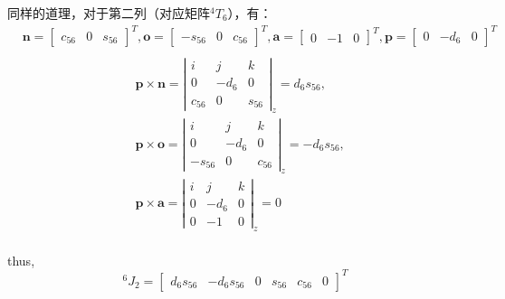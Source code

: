 \documentclass{ctexart}
\begin{document}
同样的道理，对于第二列（对应矩阵$^4T_6$），有：
\begin{equation*}
	\begin{aligned}
		&\boldsymbol{n} = \begin{bmatrix}
			c_{56} & 0 & s_{56}
		\end{bmatrix}^T, \boldsymbol{o} = \begin{bmatrix}
			-s_{56} & 0 & c_{56}
		\end{bmatrix}^T, \boldsymbol{a} = \begin{bmatrix}
			0 & -1 & 0
		\end{bmatrix}^T, \boldsymbol{p} = \begin{bmatrix}
			0 & -d_6 & 0
		\end{bmatrix}^T\\
	\end{aligned}
\end{equation*}
\begin{equation}
	\begin{aligned}
		&\boldsymbol{p}\times \boldsymbol{n} = \left| \begin{matrix}
			i & j & k \\
			0 & -d_6 & 0 \\
			c_{56} & 0 & s_{56}
		\end{matrix} \right|_z = d_6s_{56},\\& \boldsymbol{p}\times \boldsymbol{o} = \left| \begin{matrix}
			i & j & k \\
			0 & -d_6 & 0 \\
			-s_{56} & 0 & c_{56}
		\end{matrix} \right|_z = -d_6s_{56}, \\&\boldsymbol{p}\times \boldsymbol{a} = \left| \begin{matrix}
			i & j & k \\
			0 & -d_6 & 0 \\
			0 & -1 & 0
		\end{matrix} \right|_z = 0\\
	\end{aligned}
\end{equation}

thus,
\begin{equation*}
^6J_{2} = \begin{bmatrix}
	d_6s_{56} & -d_6s_{56} & 0 & s_{56} & c_{56} & 0
\end{bmatrix}^T
\end{equation*}
\end{document}
